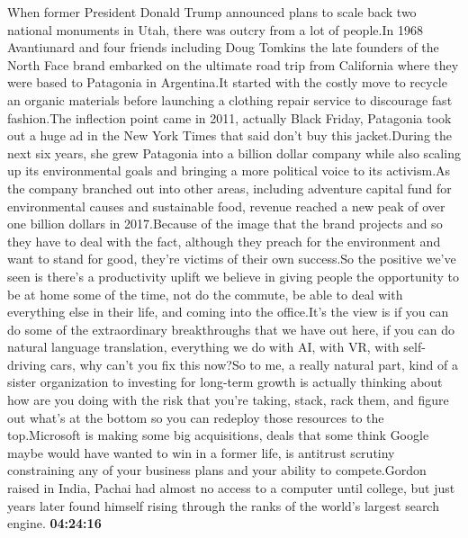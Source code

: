 \documentclass{article}%
\begin{document}
When former President Donald Trump announced plans to scale back two national monuments in Utah, there was outcry from a lot of people.In 1968 Avantiunard and four friends including Doug Tomkins the late founders of the North Face brand embarked on the ultimate road trip from California where they were based to Patagonia in Argentina.It started with the costly move to recycle an organic materials before launching a clothing repair service to discourage fast fashion.The inflection point came in 2011, actually Black Friday, Patagonia took out a huge ad in the New York Times that said don't buy this jacket.During the next six years, she grew Patagonia into a billion dollar company while also scaling up its environmental goals and bringing a more political voice to its activism.As the company branched out into other areas, including adventure capital fund for environmental causes and sustainable food, revenue reached a new peak of over one billion dollars in 2017.Because of the image that the brand projects and so they have to deal with the fact, although they preach for the environment and want to stand for good, they're victims of their own success.So the positive we've seen is there's a productivity uplift we believe in giving people the opportunity to be at home some of the time, not do the commute, be able to deal with everything else in their life, and coming into the office.It's the view is if you can do some of the extraordinary breakthroughs that we have out here, if you can do natural language translation, everything we do with AI, with VR, with self{-}driving cars, why can't you fix this now?So to me, a really natural part, kind of a sister organization to investing for long{-}term growth is actually thinking about how are you doing with the risk that you're taking, stack, rack them, and figure out what's at the bottom so you can redeploy those resources to the top.Microsoft is making some big acquisitions, deals that some think Google maybe would have wanted to win in a former life, is antitrust scrutiny constraining any of your business plans and your ability to compete.Gordon raised in India, Pachai had almost no access to a computer until college, but just years later found himself rising through the ranks of the world's largest search engine.%
\textbf{04:24:16}%
\newline%
\end{document}
